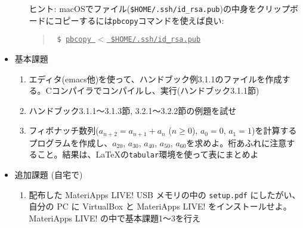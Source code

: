 \documentclass[11pt]{jarticle}
\begin{document}
\begin{itemize}
\begin{enumerate}
    ヒント: macOSでファイル({\tt \$HOME/.ssh/id\_rsa.pub})の中身をクリップボードにコピーするには{\tt pbcopy}コマンドを使えば良い:
    \begin{quote} \tt
      \$ \underline{pbcopy $<$ \$HOME/.ssh/id\_rsa.pub}
    \end{quote}
  \end{enumerate}
\item 基本課題
  \begin{enumerate}
  \item エディタ(emacs他)を使って、ハンドブック例3.1.1のファイルを作成する。Cコンパイラでコンパイルし、実行(ハンドブック3.1.1節)
  \item ハンドブック3.1.1〜3.1.3節, 3.2.1〜3.2.2節の例題を試せ
  \item フィボナッチ数列($a_{n+2}=a_{n+1}+a_n$ ($n \ge 0$), $a_0=0$, $a_1=1$)を計算するプログラムを作成し、$a_{20}$, $a_{30}$, $a_{40}$, $a_{50}$, $a_{60}$を求めよ。桁あふれに注意すること。結果は、\LaTeX の{\tt tabular}環境を使って表にまとめよ
  \end{enumerate}
\item 追加課題 (自宅で)
  \begin{enumerate}
  \item 配布した MateriApps LIVE! USB メモリの中の {\tt setup.pdf} にしたがい、自分の PC に VirtualBox と MateriApps LIVE! をインストールせよ。MateriApps LIVE! の中で基本課題1〜3を行え
  \end{enumerate}
\end{itemize}
\end{document}
